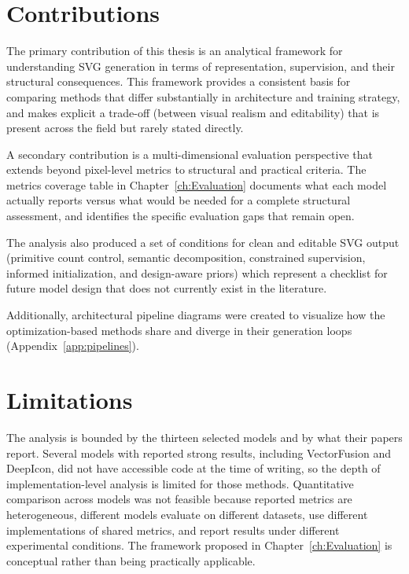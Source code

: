 \section{Contributions}

The primary contribution of this thesis is an 
analytical framework for understanding SVG generation 
in terms of representation, supervision, and their 
structural consequences. This framework provides a 
consistent basis for comparing methods that differ 
substantially in architecture and training strategy, 
and makes explicit a trade-off (between visual realism 
and editability) that is present across the field but 
rarely stated directly.

A secondary contribution is a multi-dimensional 
evaluation perspective that extends beyond pixel-level 
metrics to structural and practical criteria. The 
metrics coverage table in Chapter~\ref{ch:Evaluation} 
documents what each model actually reports versus what 
would be needed for a complete structural assessment, 
and identifies the specific evaluation gaps that remain 
open.

The analysis also produced a set of conditions for 
clean and editable SVG output (primitive count control, 
semantic decomposition, constrained 
supervision, informed initialization, and design-aware 
priors) which represent a checklist for future model 
design that does not currently exist in the literature.

Additionally, architectural pipeline diagrams were 
created to visualize how the optimization-based 
methods share and diverge in their generation loops 
(Appendix~\ref{app:pipelines}).

\section{Limitations}

The analysis is bounded by the thirteen selected 
models and by what their papers report. Several models 
with reported strong results, including VectorFusion 
and DeepIcon, did not have accessible code at the time 
of writing, so the depth of implementation-level analysis 
is limited for those methods. Quantitative comparison across models was not 
feasible because reported metrics are heterogeneous,
different models evaluate on different datasets, use 
different implementations of shared metrics, and report 
results under different experimental conditions. The framework proposed in 
Chapter~\ref{ch:Evaluation} is conceptual rather than 
being practically applicable.


